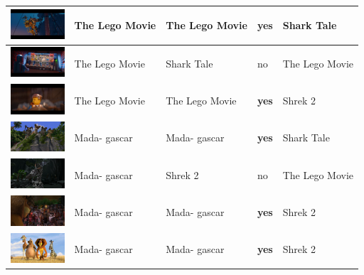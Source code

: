 \documentclass[conference]{IEEEtran}
\begin{document}
\begin{table}[ht]
\begin{tabular}{||P{2cm}|P{1.0cm}|P{1.2cm}|P{1.0cm}|P{1.2cm}||}
  \hline\vspace{0.1cm}
  \includegraphics[width=2cm]{lego_1.png} & The Lego Movie & The Lego Movie & \textbf{yes} & Shark Tale\\
  
  \hline\vspace{0.1cm}
  \includegraphics[width=2cm]{lego_2.png} & The Lego Movie & Shark Tale & no & The Lego Movie\\
  
  \hline\vspace{0.1cm}
  \includegraphics[width=2cm]{lego_3.png} & The Lego Movie & The Lego Movie & \textbf{yes} & Shrek 2\\
  
  
  
  
  \hline\vspace{0.1cm}
  \includegraphics[width=2cm]{madagascar_0.png} & Mada- gascar & Mada- gascar & \textbf{yes} & Shark Tale\\
  \hline\vspace{0.1cm}
  \includegraphics[width=2cm]{madagascar_1.png} & Mada- gascar & Shrek 2 & no & The Lego Movie\\
  \hline\vspace{0.1cm}
  \includegraphics[width=2cm]{madagascar_2.png} & Mada- gascar & Mada- gascar & \textbf{yes} & Shrek 2\\
  \hline\vspace{0.1cm}
  \includegraphics[width=2cm]{madagascar_3.jpg} & Mada- gascar & Mada- gascar & \textbf{yes} & Shrek 2\\
  
  

  \hline
  \end{tabular}
\end{table}
	
\end{document}
